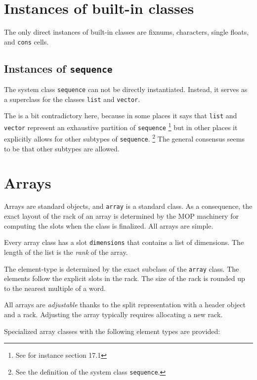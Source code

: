 \section{Instances of built-in classes}

The only direct instances of built-in classes are fixnums, characters,
single floats, and \texttt{cons} cells.

\subsection{Instances of \texttt{sequence}}

The system class \texttt{sequence} can not be directly instantiated.
Instead, it serves as a superclass for the classes \texttt{list} and
\texttt{vector}.

The \hs{} is a bit contradictory here, because
in some places it says that \texttt{list} and \texttt{vector}
represent an exhaustive partition of \texttt{sequence}%
\footnote{See for instance section 17.1}
but in other places it explicitly allows for other subtypes of
\texttt{sequence}.%
\footnote{See the definition of the system class \texttt{sequence}.}
The general consensus seems to be that other subtypes are allowed.

\section{Arrays}
\label{sec-data-representation-arrays}

Arrays are standard objects, and \texttt{array} is a standard class.
As a consequence, the exact layout of the rack of an array is
determined by the MOP machinery for computing the slots when the class
is finalized.  All arrays are simple.

Every array class has a slot \texttt{dimensions} that contains a list
of dimensions.  The length of the list is the \emph{rank} of the
array.

The element-type is determined by the exact subclass of the
\texttt{array} class.  The elements follow the explicit slots in the
rack.  The size of the rack is rounded up to the nearest multiple of a
word.

All arrays are \emph{adjustable} thanks to the split representation
with a header object and a rack.  Adjusting the array
typically requires allocating a new rack.

Specialized array classes with the following element types are
provided:

